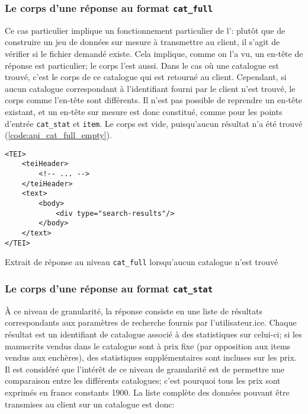 \subsubsection{Le corps d'une réponse au format \texttt{cat\_full}}
Ce cas particulier implique un fonctionnement particulier de l'\api{}: plutôt que de construire un jeu de données sur mesure à transmettre au client, il s'agit de vérifier si le fichier demandé existe. Cela implique, comme on l'a vu, un en-tête de réponse est particulier; le corps l'est aussi. Dans le cas où une catalogue est trouvé, c'est le corps de ce catalogue qui est retourné au client. Cependant, si aucun catalogue correspondant à l'identifiant fourni par le client n'est trouvé, le corps comme l'en-tête sont différents. Il n'est pas possible de reprendre un en-tête existant, et un en-tête sur mesure est donc constitué, comme pour les points d'entrée \texttt{cat\_stat} et \texttt{item}. Le corps est vide, puisqu'aucun résultat n'a été trouvé (\ref{code:api_cat_full_empty}).

\begin{listing}[h!]
	\begin{verbatim}
<TEI>
	<teiHeader>
		<!-- ... -->
	</teiHeader>
	<text>
		<body>
			<div type="search-results"/>
		</body>
	</text>
</TEI>
	\end{verbatim}
	\caption{Extrait de réponse au niveau \texttt{cat\_full} lorsqu'aucun catalogue n'est trouvé}
	\label{code:api_cat_full_empty}
\end{listing}

\subsubsection{Le corps d'une réponse au format \texttt{cat\_stat}}
À ce niveau de granularité, la réponse consiste en une liste de résultats correspondants aux paramètres de recherche fournis par l'utilisateur.ice. Chaque résultat est un identifiant de catalogue associé à des statistiques sur celui-ci; si les manuscrits vendus dans le catalogue sont à prix fixe (par opposition aux items vendus aux enchères), des statistiques supplémentaires sont incluses sur les prix. Il est considéré que l'intérêt de ce niveau de granularité est de permettre une comparaison entre les différents catalogues; c'est pourquoi tous les prix sont exprimés en francs constants 1900. La liste complète des données pouvant être transmises au client sur un catalogue est donc:

